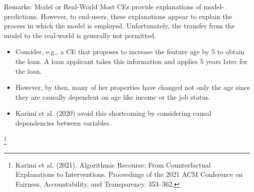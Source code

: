 \documentclass[11pt,compress,t,notes=noshow, xcolor=table]{beamer}
\begin{document}
\begin{vbframe}{Remarks: Model or Real-World}
Most CEs provide explanations of model-predictions. However, to end-users, these explanations appear to explain the process in which the model is employed. Unfortunately, the transfer from the model to the real-world is generally not permitted.
	\begin{itemize}
	\item Consider, e.g., a CE that proposes to increase the feature age by 5 to obtain the loan. A loan applicant takes this information and applies 5 years later for the loan. 
	\item However, by then, many of her properties have changed not only the age since they are causally dependent on age like income or the job status.
	\item Karimi et al. (2020) avoid this shortcoming by considering causal dependencies between variables.
	\end{itemize}
\footnote[frame]{Karimi et al. (2021). Algorithmic Recourse: From Counterfactual Explanations to Interventions.  Proceedings of the 2021 ACM Conference on Fairness, Accountability, and Transparency. 353–362.}
\end{vbframe}
\end{document}
